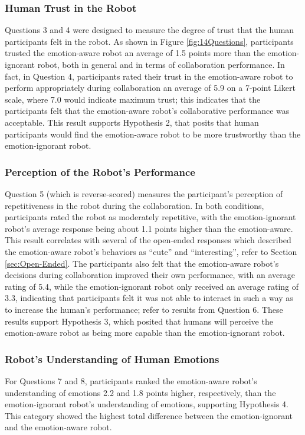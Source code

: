 \documentclass[12pt]{report}
\begin{document}
\subsubsection{Human Trust in the Robot}
\label{sec:Trust}
Questions 3 and 4 were designed to measure the degree of trust that the human
participants felt in the robot. As shown in Figure \ref{fig:14Questions},
participants trusted the emotion-aware robot an average of 1.5 points more than
the emotion-ignorant robot, both in general and in terms of collaboration
performance. In fact, in Question 4, participants rated their trust in the
emotion-aware robot to perform appropriately during collaboration an average of
5.9 on a 7-point Likert scale, where 7.0 would indicate maximum trust; this
indicates that the participants felt that the emotion-aware robot's
collaborative performance was acceptable. This result supports Hypothesis 2,
that posits that human participants would find the emotion-aware robot to be
more trustworthy than the emotion-ignorant robot.

\subsubsection{Perception of the Robot's Performance} 
\label{sec:Performance}
Question 5 (which is reverse-scored) measures the participant's perception of
repetitiveness in the robot during the collaboration. In both conditions,
participants rated the robot as moderately repetitive, with the emotion-ignorant
robot's average response being about 1.1 points higher than the emotion-aware.
This result correlates with several of the open-ended responses which described
the emotion-aware robot's behaviors as ``cute'' and ``interesting'', refer to
Section \ref{sec:Open-Ended}. The participants also felt that the emotion-aware
robot's decisions during collaboration improved their own performance, with an
average rating of 5.4, while the emotion-ignorant robot only received an average
rating of 3.3, indicating that participants felt it was not able to interact in
such a way as to increase the human's performance; refer to results from
Question 6. These results support Hypothesis 3, which posited that humans will
perceive the emotion-aware robot as being more capable than the emotion-ignorant
robot.

\subsubsection{Robot's Understanding of Human Emotions} 
\label{sec:Emotions}
For Questions 7 and 8, participants ranked the emotion-aware robot's
understanding of emotions 2.2 and 1.8 points higher, respectively, than the
emotion-ignorant robot's understanding of emotions, supporting Hypothesis 4.
This category showed the highest total difference between the emotion-ignorant
and the emotion-aware robot.
\end{document}
